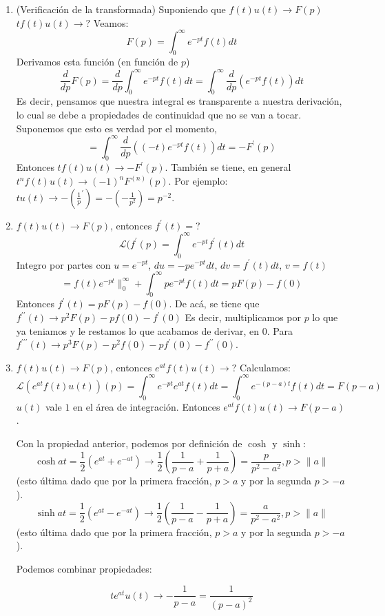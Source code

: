 \begin{enumerate}

\item (Verificaci\'on de la transformada) Suponiendo que $f(t)u(t) \longrightarrow F(p)$ %
$tf(t)u(t) \longrightarrow ?$ %
Veamos:
$$
F(p)= \int_0^{\infty}e^{-pt}f(t)dt
$$
Derivamos esta funci\'on (en funci\'on de $p$)
$$
\frac{d}{dp}F(p) = \frac{d}{dp}\int_0^{\infty}e^{-pt}f(t)dt = \int_0^{\infty}\frac{d}{dp}(e^{-pt}f(t))dt
$$
Es decir, pensamos que nuestra integral es transparente a nuestra derivaci\'on, lo cual se debe a propiedades de continuidad que no se van a tocar. Suponemos que esto es verdad por el momento,
$$
= \int_0^{\infty}\frac{d}{dp}((-t) e^{-pt}f(t))dt = -F^{\prime}(p)
$$
Entonces $tf(t)u(t) \longrightarrow -F^{\prime}(p)$. %
Tambi\'en se tiene, en general %
$t^n f(t)u(t) \longrightarrow (-1)^n F^{(n)}(p)$.
Por ejemplo: $tu(t) \longrightarrow -(\frac{1}{p}^{\prime}) = -(-\frac{1}{p^2}) = p^{-2}$.

\item $f(t)u(t) \longrightarrow F(p)$, entonces $f^{\prime}(t) = ?$
$$
\mathcal{L}(f^{\prime}(p) = \int_0^{\infty}e^{-pt}f^{\prime}(t)dt
$$%
Integro por partes con $u = e^{-pt}$, $du = -p e^{-pt}dt$, $dv = f^{\prime}(t)dt$, $v = f(t)$
$$
=f(t)e^{-pt}\|^{\infty}_0 + \int_0^{\infty}pe^{-pt}f(t)dt = pF(p) - f(0)
$$
Entonces $f^{\prime}(t) = pF(p) - f(0)$. De ac\'a, se tiene que $f^{\prime\prime}(t) \longrightarrow p^2F(p)-pf(0)-f^{\prime}(0)$ %
Es decir, multiplicamos por $p$ lo que ya teniamos y le restamos lo que acabamos de derivar, en $0$. Para $f^{\prime\prime\prime}(t) \longrightarrow p^3F(p)-p^2f(0) - pf^{\prime}(0) -f^{\prime\prime}(0)$.

\item $f(t)u(t) \longrightarrow F(p)$, entonces $e^{at}f(t)u(t) \longrightarrow ?$ %
Calculamos:
$$
\mathcal{L}(e^{at}f(t)u(t))(p) =\int_0^{\infty}e^{-pt}e^{at}f(t)dt = \int_0^{\infty}e^{-(p-a)t}f(t)dt = F(p-a)
$$
$u(t)$ vale $1$ en el \'area de integraci\'on. Entonces $e^{at}f(t)u(t) \longrightarrow F(p-a)$.

Con la propiedad anterior, podemos por definici\'on de $\cosh$ y $\sinh$:
$$
\cosh{at} = \frac{1}{2}(e^{at} + e^{-at}) \longrightarrow \frac{1}{2}(\frac{1}{p-a} + \frac{1}{p+a}) = \frac{p}{p^2-a^2},p>\|a\|
$$ (esto \'ultima dado que por la primera fracci\'on, $p > a$ y por la segunda $p > -a$). %
$$
\sinh{at} = \frac{1}{2}(e^{at} - e^{-at}) \longrightarrow \frac{1}{2}(\frac{1}{p-a} - \frac{1}{p+a}) = \frac{a}{p^2-a^2},p>\|a\|
$$ (esto \'ultima dado que por la primera fracci\'on, $p > a$ y por la segunda $p > -a$). %

Podemos combinar propiedades:

$$
t e^{at} u(t) \longrightarrow -\frac{1}{p-a} = \frac{1}{(p-a)^2}
$$ %

\end{enumerate}

